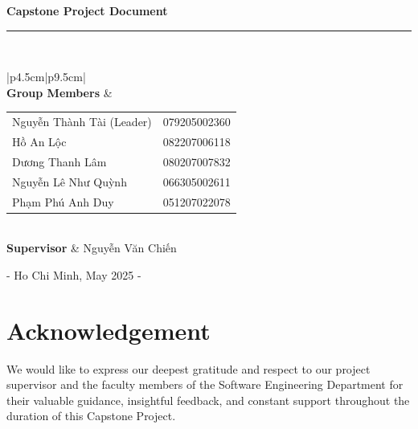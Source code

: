 \documentclass[a4paper,11pt]{book}
\begin{document}
\frontmatter

\begin{titlepage}
    \centering
    \vspace*{2cm}
    
    {\Huge \textbf{Capstone Project Document}} \\[0.8cm]
    {\color{lightgray}\rule{\linewidth}{0.5pt}} \\[2cm]
    
    \begin{table}[H]
        \centering
        \renewcommand{\arraystretch}{1.5}
        \begin{tabular}{|p{4.5cm}|p{9.5cm}|}
            \hline
             \\ \hline
            \textbf{Group Members} & 
            \begin{tabular}[t]{@{}p{6.0cm} l@{}}
                Nguyễn Thành Tài (Leader) & 079205002360 \\
                Hồ An Lộc & 082207006118 \\
                Dương Thanh Lâm & 080207007832 \\
                Nguyễn Lê Như Quỳnh & 066305002611 \\
                Phạm Phú Anh Duy & 051207022078 \\
            \end{tabular} \\ \hline
            \textbf{Supervisor} & Nguyễn Văn Chiến \\ \hline
        \end{tabular}
    \end{table}

    \vfill

    {\large - Ho Chi Minh, May 2025 -}
\end{titlepage}

\tableofcontents
\listoffigures
\listoftables

\chapter*{Acknowledgement}
We would like to express our deepest gratitude and respect to our project supervisor and the faculty members of the Software Engineering Department for their valuable guidance, insightful feedback, and constant support throughout the duration of this Capstone Project.
\end{document}
